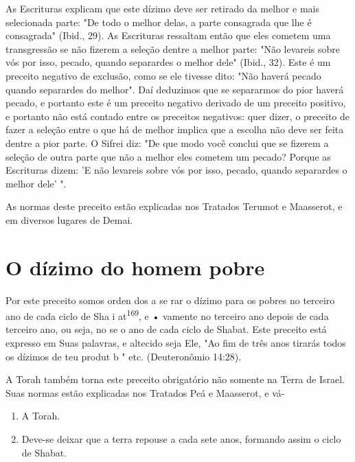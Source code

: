 As Escrituras explicam que este dízimo deve ser retirado da melhor e
mais selecionada parte: "De todo o melhor delas, a parte consagrada que
lhe é consagrada" (Ibid., 29). As Escrituras ressaltam então que eles
cometem uma transgressão se não fizerem a seleção dentre a melhor parte:
"Não levareis so­bre vós por isso, pecado, quando separardes o melhor
dele" (Ibid., 32). Este é um preceito negativo de exclusão, como se ele
tivesse dito: "Não haverá pe­cado quando separardes do melhor". Daí
deduzimos que se separarmos do pior haverá pecado, e portanto este é um
preceito negativo derivado de um precei­to positivo, e portanto não está
contado entre os preceitos negativos: quer di­zer, o preceito de fazer a
seleção entre o que há de melhor implica que a esco­lha não deve ser
feita dentre a pior parte. O Sifrei diz: "De que modo você con­clui que
se fizerem a seleção de outra parte que não a melhor eles cometem um
pecado? Porque as Escrituras dizem: 'E não levareis sobre vós por isso,
pe­cado, quando separardes o melhor dele' ".

As normas deste preceito estão explicadas nos Tratados Terumot e
Maasserot, e em diversos lugares de Demai.

\section{O dízimo do homem pobre}

Por este preceito somos orden dos a se rar o dízimo para os po­bres no
terceiro ano de cada ciclo de Sha i at\textsuperscript{169}, e • vamente
no terceiro ano depois de cada terceiro ano, ou seja, no se o ano de
cada ciclo de Shabat. Este preceito está expresso em Suas palavras, e
altecido seja Ele, "Ao fim de três anos tirarás todos os dízimos de teu
produt b " etc. (Deuteronômio 14:28).

A Torah também torna este preceito obrigatório não somente na Terra de
Israel. Suas normas estão explicadas nos Tratados Peá e Maasserot, e vá-


\begin{enumerate}
\def\labelenumi{\arabic{enumi}.}
\setcounter{enumi}{167}
\item
 
 A Torah.
 
\item
 
 Deve-se deixar que a terra repouse a cada sete anos, formando assim o
 ciclo de Shabat.
 
\end{enumerate}




